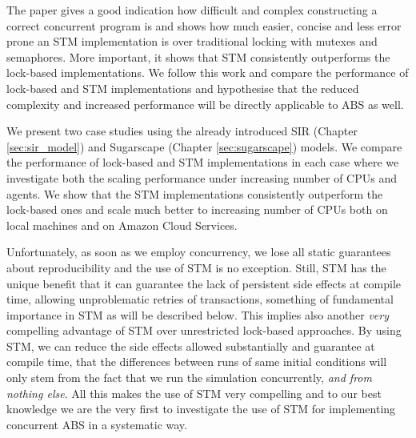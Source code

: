 The paper \cite{discolo_lock_2006} gives a good indication how difficult and complex constructing a correct concurrent program is and shows how much easier, concise and less error prone an STM implementation is over traditional locking with mutexes and semaphores. More important, it shows that STM consistently outperforms the lock-based implementations. We follow this work and compare the performance of lock-based and STM implementations and hypothesise that the reduced complexity and increased performance will be directly applicable to ABS as well.

We present two case studies using the already introduced SIR (Chapter \ref{sec:sir_model}) and Sugarscape (Chapter \ref{sec:sugarscape}) models. We compare the performance of lock-based and STM implementations in each case where we investigate both the scaling performance under increasing number of CPUs and agents. We show that the STM implementations consistently outperform the lock-based ones and scale much better to increasing number of CPUs both on local machines and on Amazon Cloud Services.

Unfortunately, as soon as we employ concurrency, we lose all static guarantees about reproducibility and the use of STM is no exception. Still, STM has the unique benefit that it can guarantee the lack of persistent side effects at compile time, allowing unproblematic retries of transactions, something of fundamental importance in STM as will be described below. This implies also another \textit{very} compelling advantage of STM over unrestricted lock-based approaches. By using STM, we can reduce the side effects allowed substantially and guarantee at compile time, that the differences between runs of same initial conditions will only stem from the fact that we run the simulation concurrently, \textit{and from nothing else}. All this makes the use of STM very compelling and to our best knowledge we are the very first to investigate the use of STM for implementing concurrent ABS in a systematic way.










